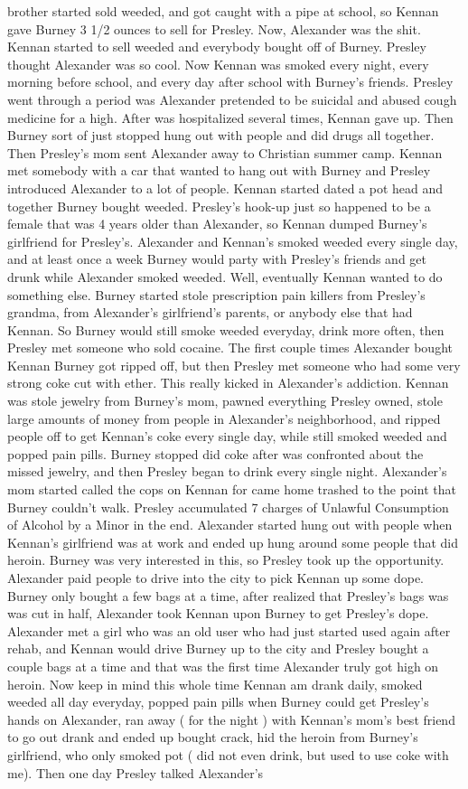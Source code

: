 \documentclass[12pt]{book}
\begin{document}
brother started sold weeded, and got caught with a pipe at school, so Kennan gave Burney 3 1/2 ounces to sell for Presley. Now, Alexander was the shit. Kennan started to sell weeded and everybody bought off of Burney. Presley thought Alexander was so cool. Now Kennan was smoked every night, every morning before school, and every day after school with Burney's friends. Presley went through a period was Alexander pretended to be suicidal and abused cough medicine for a high. After was hospitalized several times, Kennan gave up. Then Burney sort of just stopped hung out with people and did drugs all together. Then Presley's mom sent Alexander away to Christian summer camp. Kennan met somebody with a car that wanted to hang out with Burney and Presley introduced Alexander to a lot of people. Kennan started dated a pot head and together Burney bought weeded. Presley's hook-up just so happened to be a female that was 4 years older than Alexander, so Kennan dumped Burney's girlfriend for Presley's. Alexander and Kennan's smoked weeded every single day, and at least once a week Burney would party with Presley's friends and get drunk while Alexander smoked weeded. Well, eventually Kennan wanted to do something else. Burney started stole prescription pain killers from Presley's grandma, from Alexander's girlfriend's parents, or anybody else that had Kennan. So Burney would still smoke weeded everyday, drink more often, then Presley met someone who sold cocaine. The first couple times Alexander bought Kennan Burney got ripped off, but then Presley met someone who had some very strong coke cut with ether. This really kicked in Alexander's addiction. Kennan was stole jewelry from Burney's mom, pawned everything Presley owned, stole large amounts of money from people in Alexander's neighborhood, and ripped people off to get Kennan's coke every single day, while still smoked weeded and popped pain pills. Burney stopped did coke after was confronted about the missed jewelry, and then Presley began to drink every single night. Alexander's mom started called the cops on Kennan for came home trashed to the point that Burney couldn't walk. Presley accumulated 7 charges of Unlawful Consumption of Alcohol by a Minor in the end. Alexander started hung out with people when Kennan's girlfriend was at work and ended up hung around some people that did heroin. Burney was very interested in this, so Presley took up the opportunity. Alexander paid people to drive into the city to pick Kennan up some dope. Burney only bought a few bags at a time, after realized that Presley's bags was was cut in half, Alexander took Kennan upon Burney to get Presley's dope. Alexander met a girl who was an old user who had just started used again after rehab, and Kennan would drive Burney up to the city and Presley bought a couple bags at a time and that was the first time Alexander truly got high on heroin. Now keep in mind this whole time Kennan am drank daily, smoked weeded all day everyday, popped pain pills when Burney could get Presley's hands on Alexander, ran away ( for the night ) with Kennan's mom's best friend to go out drank and ended up bought crack, hid the heroin from Burney's girlfriend, who only smoked pot ( did not even drink, but used to use coke with me). Then one day Presley talked Alexander's 
\end{document}
